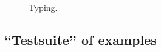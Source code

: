 \documentclass[preprint]{sigplanconf}
\begin{document}
\begin{figure}


  \caption{Typing.}
\end{figure}

\subsection{``Testsuite'' of examples}
\end{document}
